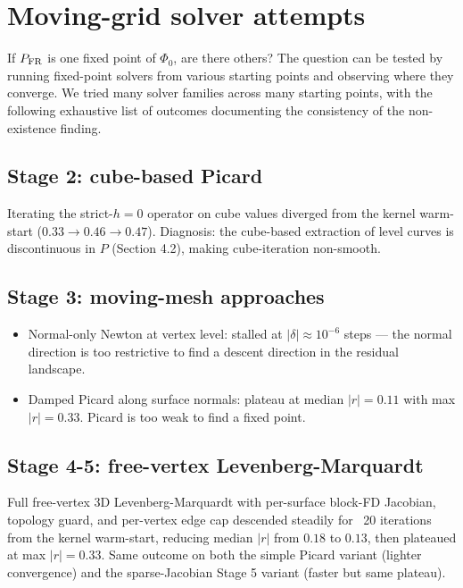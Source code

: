 \documentclass[11pt]{article}
\newcommand{\1}{\mathbf{1}}
\newcommand{\PFR}{P_{\rm FR}}
\begin{document}
\section{Moving-grid solver attempts}

If $\PFR$ is one fixed point of $\Phi_0$, are there others?  The
question can be tested by running fixed-point solvers from various
starting points and observing where they converge.  We tried many
solver families across many starting points, with the following
exhaustive list of outcomes documenting the consistency of the
non-existence finding.

\subsection{Stage 2: cube-based Picard}

Iterating the strict-$h=0$ operator on cube values diverged from the
kernel warm-start ($0.33 \to 0.46 \to 0.47$).  Diagnosis: the cube-based
extraction of level curves is discontinuous in $P$ (Section 4.2),
making cube-iteration non-smooth.

\subsection{Stage 3: moving-mesh approaches}

\begin{itemize}
\item Normal-only Newton at vertex level: stalled at $|\delta| \approx
10^{-6}$ steps --- the normal direction is too restrictive to find a
descent direction in the residual landscape.
\item Damped Picard along surface normals: plateau at median $|r| = 0.11$
with max $|r| = 0.33$.  Picard is too weak to find a fixed point.
\end{itemize}

\subsection{Stage 4-5: free-vertex Levenberg-Marquardt}

Full free-vertex 3D Levenberg-Marquardt with per-surface block-FD
Jacobian, topology guard, and per-vertex edge cap descended steadily for
~20 iterations from the kernel warm-start, reducing median $|r|$ from
$0.18$ to $0.13$, then plateaued at max $|r| = 0.33$.  Same outcome on
both the simple Picard variant (lighter convergence) and the
sparse-Jacobian Stage 5 variant (faster but same plateau).
\end{document}
